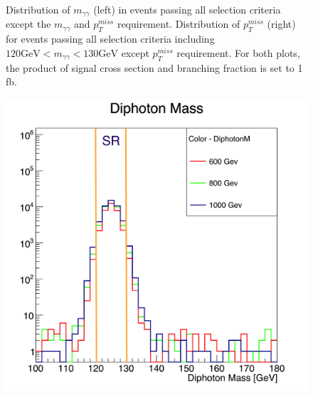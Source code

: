 \documentclass[12pt,A4paper]{article}
\begin{document}
\begin{figure}[h!]
\begin{minipage}{.5\textwidth}
\end{minipage}
\caption{Distribution of $m_{\gamma\gamma}$ (left) in events passing all selection criteria except the $m_{\gamma\gamma}$ and $p_T^{miss}$ requirement. Distribution of $p_T^{miss}$ (right) for events passing all selection criteria including $120 \textrm{GeV} < m_{\gamma\gamma} < 130 \textrm{GeV}$ except $p_T^{miss}$ requirement. For both plots, the product of signal cross section and branching fraction is set to 1 fb.}
\end{figure}

\begin{figure}[h!]
\centering
\begin{minipage}{.5\textwidth}
  \centering
  \includegraphics[scale=0.16]{img/MZp_M-1.png}
\end{minipage}%
\begin{minipage}{.5\textwidth}
  \centering

\end{minipage}
\end{figure}
\end{document}
